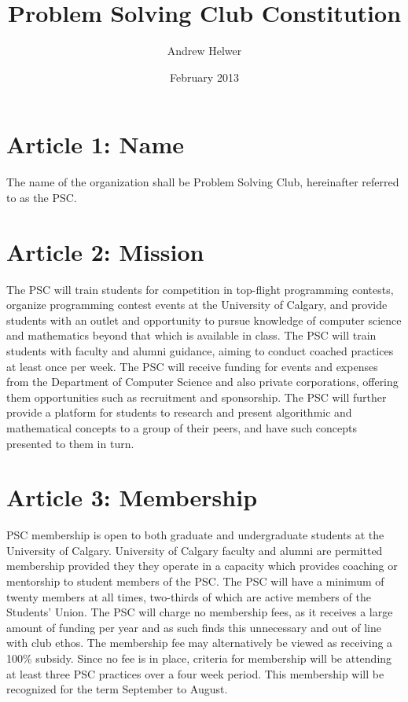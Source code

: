 \documentclass{article}
\begin{document}
\title{Problem Solving Club Constitution}
\author{Andrew Helwer}
\date{February 2013}
\maketitle

\section{Article 1: Name}

The name of the organization shall be Problem Solving Club, hereinafter referred to as the PSC.

\section{Article 2: Mission}

The PSC will train students for competition in top-flight programming contests, organize programming contest events at the University of Calgary, and provide students with an outlet and opportunity to pursue knowledge of computer science and mathematics beyond that which is available in class.
The PSC will train students with faculty and alumni guidance, aiming to conduct coached practices at least once per week. 
The PSC will receive funding for events and expenses from the Department of Computer Science and also private corporations, offering them opportunities such as recruitment and sponsorship.
The PSC will further provide a platform for students to research and present algorithmic and mathematical concepts to a group of their peers, and have such concepts presented to them in turn.

\section{Article 3: Membership}

PSC membership is open to both graduate and undergraduate students at the University of Calgary.
University of Calgary faculty and alumni are permitted membership provided they they operate in a capacity which provides coaching or mentorship to student members of the PSC.
The PSC will have a minimum of twenty members at all times, two-thirds of which are active members of the Students' Union.
The PSC will charge no membership fees, as it receives a large amount of funding per year and as such finds this unnecessary and out of line with club ethos.
The membership fee may alternatively be viewed as receiving a 100\% subsidy.
Since no fee is in place, criteria for membership will be attending at least three PSC practices over a four week period.
This membership will be recognized for the term September to August.
\end{document}

